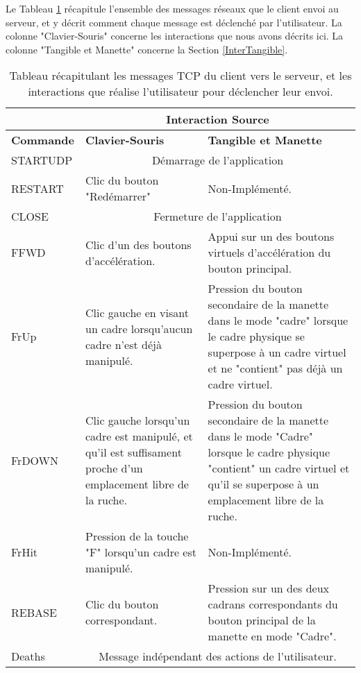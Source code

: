 		 Le Tableau \ref{tabTotalInterClient} récapitule l'ensemble des messages réseaux que le client envoi au serveur, et y décrit comment chaque message est déclenché par l'utilisateur. La colonne "Clavier-Souris" concerne les interactions que nous avons décrits ici. La colonne "Tangible et Manette" concerne la Section \ref{InterTangible}.
	
	\begin{table}
		\begin{tabularx}{\textwidth}{|l|p{4.5cm}|X|}
		\hline
		 & \multicolumn{2}{c|}{\textbf{Interaction Source}}\\
		 \hline
		 \textbf{Commande} & \textbf{Clavier-Souris} & \textbf{Tangible et Manette}\\
		 \hline
		 STARTUDP & \multicolumn{2}{c|}{Démarrage de l'application}\\
		 \hline
		 RESTART & Clic du bouton "Redémarrer" & Non-Implémenté.\\
		 \hline
		 CLOSE & \multicolumn{2}{c|}{Fermeture de l'application}\\
		 \hline
		 FFWD & Clic d'un des boutons d'accélération. & Appui sur un des boutons virtuels d'accélération du bouton principal.\\
		 \hline
		 FrUp & Clic gauche en visant un cadre lorsqu'aucun cadre n'est déjà manipulé. & Pression du bouton secondaire de la manette dans le mode "cadre" lorsque le cadre physique se superpose à un cadre virtuel et ne "contient" pas déjà un cadre virtuel.\\
		 \hline
		 FrDOWN & Clic gauche lorsqu'un cadre est manipulé, et qu'il est suffisament proche d'un emplacement libre de la ruche. & Pression du bouton secondaire de la manette dans le mode "Cadre" lorsque le cadre physique "contient" un cadre virtuel et qu'il se superpose à un emplacement libre de la ruche.\\
		 \hline
		 FrHit & Pression de la touche "F" lorsqu'un cadre est manipulé. & Non-Implémenté.\\
		 \hline
		 REBASE & Clic du bouton correspondant. & Pression sur un des deux cadrans correspondants du bouton principal de la manette en mode "Cadre".\\
		 \hline
		 Deaths & \multicolumn{2}{c|}{Message indépendant des actions de l'utilisateur.}\\
		 \hline 
		\end{tabularx}
	\caption{Tableau récapitulant les messages TCP du client vers le serveur, et les interactions que réalise l'utilisateur pour déclencher leur envoi.}
	\label{tabTotalInterClient}
	\end{table}
		
